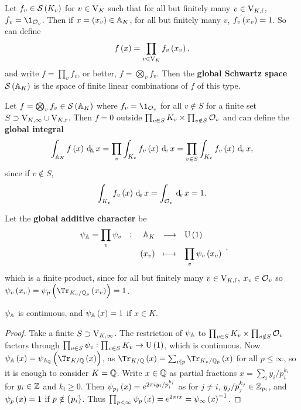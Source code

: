 \begin{definition*}
Let $ f_v \in \SSS\br{K_v} $ for $ v \in \V_K $ such that for all but finitely many $ v \in \V_{K, \f} $, $ f_v = \1_{\OOO_v} $. Then if $ x = \br{x_v} \in \AA_K $, for all but finitely many $ v $, $ f_v\br{x_v} = 1 $. So can define
$$ f\br{x} = \prod_{v \in \V_K} f_v\br{x_v}, $$
and write $ f = \prod_v f_v $, or better, $ f = \bigotimes_v f_v $. Then the \textbf{global Schwartz space} $ \SSS\br{\AA_K} $ is the space of finite linear combinations of $ f $ of this type.
\end{definition*}

\begin{definition*}
Let $ f = \bigotimes_v f_v \in \SSS\br{\AA_K} $ where $ f_v = \1_{\OOO_v} $ for all $ v \notin S $ for a finite set $ S \supset \V_{K, \infty} \cup \V_{K, \r} $. Then $ f = 0 $ outside $ \prod_{v \in S} K_v \times \prod_{v \notin S} \OOO_v $ and can define the \textbf{global integral}
$$ \intA{f\br{x}}{x} = \prod_v \intv{f_v\br{x}}{x} = \prod_{v \in S} \intv{f_v\br{x}}{x}, $$
since if $ v \notin S $,
$$ \intv{f_v\br{x}}{x} = \intv[\OOO_v]{}{x} = 1. $$
\end{definition*}

\begin{definition*}
Let the \textbf{global additive character} be
$$ \function[\psi_\AA = \prod_v \psi_v]{\AA_K}{\U\br{1}}{\br{x_v}}{\prod_v \psi_v\br{x_v}}, $$
which is a finite product, since for all but finitely many $ v \in \V_{K, \f} $, $ x_v \in \OOO_v $ so $ \psi_v\br{x_v} = \psi_p\br{\Tr_{K_v / \QQ_p}\br{x_v}} = 1 $.
\end{definition*}

\begin{proposition}
$ \psi_\AA $ is continuous, and $ \psi_\AA\br{x} = 1 $ if $ x \in K $.
\end{proposition}

\begin{proof}
Take a finite $ S \supset \V_{K, \infty} $. The restriction of $ \psi_\AA $ to $ \prod_{v \in S} K_v \times \prod_{v \notin S} \OOO_v $ factors through $ \prod_{v \in S} \psi_v : \prod_{v \in S} K_v \to \U\br{1} $, which is continuous. Now $ \psi_\AA\br{x} = \psi_{\AA_\QQ}\br{\Tr_{K / \QQ}\br{x}} $, as $ \Tr_{K / \QQ}\br{x} = \sum_{v \mid p} \Tr_{K_v / \QQ_p}\br{x} $ for all $ p \le \infty $, so it is enough to consider $ K = \QQ $. Write $ x \in \QQ $ as partial fractions $ x = \sum_i y_i / p_i^{k_i} $ for $ y_i \in \ZZ $ and $ k_i \ge 0 $. Then $ \psi_{p_i}\br{x} = e^{2\pi iy_i / p_i^{k_i}} $ as for $ j \ne i $, $ y_j / p_j^{k_j} \in \ZZ_{p_i} $, and $ \psi_p\br{x} = 1 $ if $ p \notin \cbr{p_i} $. Thus $ \prod_{p < \infty} \psi_p\br{x} = e^{2\pi ix} = \psi_\infty\br{x}^{-1} $.
\end{proof}

